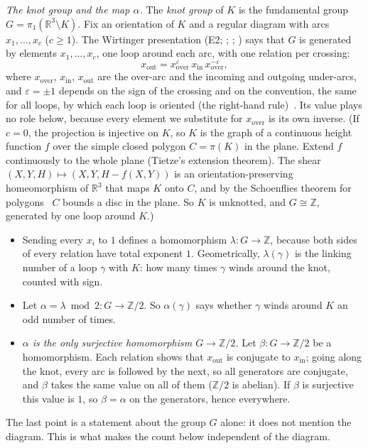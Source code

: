 \documentclass[11pt]{article}
\theoremstyle{plain}
\theoremstyle{definition}
\theoremstyle{remark}
\newcommand{\Z}{\mathbb{Z}}
\newcommand{\R}{\mathbb{R}}
\begin{document}
\emph{The knot group and the map $\alpha$.} The \emph{knot group} of $K$ is the fundamental group
$G=\pi_1(\R^3\setminus K)$. Fix an orientation of $K$ and a regular diagram with arcs $x_1,\dots,x_c$
($c\ge1$). The Wirtinger presentation (E2; \cite[Ch.~3, Knot groups]{BZ}; \cite[Ch.~3, \S D]{Rol76}; \cite[Ch.~11]{Lic97})
says that $G$ is generated by elements $x_1,\dots,x_c$, one loop around each arc, with one relation per
crossing:
\[ x_{\mathrm{out}}=x_{\mathrm{over}}^{\varepsilon}\,x_{\mathrm{in}}\,x_{\mathrm{over}}^{-\varepsilon}, \]
where $x_{\mathrm{over}}$, $x_{\mathrm{in}}$, $x_{\mathrm{out}}$ are the over-arc and the incoming and
outgoing under-arcs, and $\varepsilon=\pm1$ depends on the sign of the crossing and on the convention,
the same for all loops, by which each loop is oriented (the right-hand rule)~\cite[Ch.~3]{BZ}. Its value plays no role below, because every element we
substitute for $x_{\mathrm{over}}$ is its own inverse. (If $c=0$, the projection is
injective on $K$, so $K$ is the graph of a continuous height function $f$ over the simple closed polygon
$C=\pi(K)$ in the plane. Extend $f$ continuously to the whole plane (Tietze's extension theorem). The
shear $(X,Y,H)\mapsto(X,Y,H-f(X,Y))$ is an orientation-preserving homeomorphism of $\R^3$ that maps $K$
onto $C$, and by the Schoenflies theorem for polygons~\cite[Ch.~4]{Moi77} $C$ bounds a disc in the plane. So $K$ is
unknotted, and $G\cong\Z$, generated by one loop around $K$.)
\begin{itemize}
\item Sending every $x_i$ to $1$ defines a homomorphism $\lambda:G\to\Z$, because both sides of every
relation have total exponent $1$. Geometrically, $\lambda(\gamma)$ is the linking number of a loop
$\gamma$ with $K$: how many times $\gamma$ winds around the knot, counted with sign.
\item Let $\alpha=\lambda\bmod 2:G\to\Z/2$. So $\alpha(\gamma)$ says whether $\gamma$ winds around $K$
an odd number of times.
\item \emph{$\alpha$ is the only surjective homomorphism $G\to\Z/2$.} Let $\beta:G\to\Z/2$ be a
homomorphism. Each relation shows that $x_{\mathrm{out}}$ is conjugate to $x_{\mathrm{in}}$; going
along the knot, every arc is followed by the next, so all generators are conjugate, and $\beta$ takes
the same value on all of them ($\Z/2$ is abelian). If $\beta$ is surjective this value is $1$, so
$\beta=\alpha$ on the generators, hence everywhere.
\end{itemize}
The last point is a statement about the group $G$ alone: it does not mention the diagram. This is what
makes the count below independent of the diagram.
\end{document}
